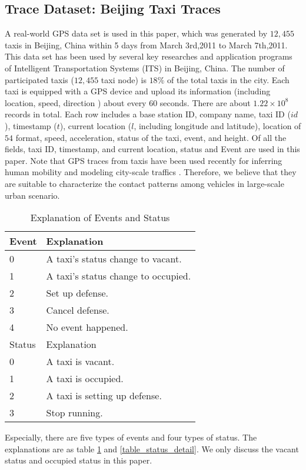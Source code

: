 \subsection{Trace Dataset: Beijing Taxi Traces}
\label{section_trace_data}

A real-world GPS data set is used in this paper, which was generated by $12,455$ taxis in Beijing, China within 5 days from March 3rd,2011 to March 7th,2011. This data set has been used by several key researches and application programs of Intelligent Transportation Systems (ITS) in Beijing, China. The number of participated taxis ($12,455$ taxi node) is $18\%$ of the total taxis in the city. Each taxi is equipped with a GPS device and upload its information (including location, speed, direction ) about every 60 seconds. There are about $1.22 \times 10^8$ records in total.
Each row includes a base station ID, company name, taxi ID ($id$), timestamp ($t$), current location ($l$, including longitude and latitude), location of $54$ format, speed, acceleration, status of the taxi, event, and height. Of all the fields, taxi ID, timestamp, and current location, status and Event are used in this paper.  Note that GPS traces from taxis have been used recently for inferring human mobility \cite{Ganti} and modeling city-scale traffics \cite{Aslam}. Therefore, we believe that they are suitable to characterize the contact patterns among vehicles in large-scale urban scenario.

\begin{table}[!t]
\caption{Explanation of Events and Status}\label{table_event_detail}
\centering
\begin{tabular}{l|l}
  \hline
  Event & Explanation \\
  \hline
  0 & A taxi's status change to vacant.\\
  \hline
  1 & A taxi's status change to occupied.\\
  \hline
  2 & Set up defense.\\
  \hline
  3 & Cancel defense.\\
  \hline
  4 & No event happened.\\
  \hline
  \hline
  Status & Explanation \\
  \hline
0 & A taxi is vacant. \\
    \hline
1 & A taxi is occupied. \\
    \hline
2 & A taxi is setting up defense. \\
    \hline
3 & Stop running.\\
  \hline
\end{tabular}
\end{table}


Especially, there are five types of events and four types of status. The explanations are as table \ref{table_event_detail} and \ref{table_status_detail}. We only discuss the vacant status and occupied status in this paper.






